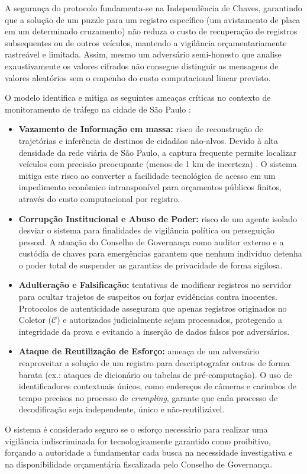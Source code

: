 A segurança do protocolo fundamenta-se na Independência de Chaves, garantindo que a solução de um puzzle para um registro específico (um avistamento de placa em um determinado cruzamento) não reduza o custo de recuperação de registros subsequentes ou de outros veículos, mantendo a vigilância orçamentariamente rastreável e limitada. Assim, mesmo um adversário semi-honesto que analise exaustivamente os valores cifrados não consegue distinguir as mensagens de valores aleatórios sem o empenho do custo computacional linear previsto.

O modelo identifica e mitiga as seguintes ameaças críticas no contexto de monitoramento de tráfego na cidade de São Paulo \cite{Link4}:
\begin{itemize}
    \item \textbf{Vazamento de Informação em massa:} risco de reconstrução de trajetórias e inferência de destinos de cidadãos não-alvos. Devido à alta densidade da rede viária de São Paulo, a captura frequente permite localizar veículos com precisão preocupante (menos de 1 km de incerteza) \cite{Link5}. O sistema mitiga este risco ao converter a facilidade tecnológica de acesso em um impedimento econômico intransponível para orçamentos públicos finitos, através do custo computacional por registro.

    \item \textbf{Corrupção Institucional e Abuso de Poder:} risco de um agente isolado desviar o sistema para finalidades de vigilância política ou perseguição pessoal. A atuação do Conselho de Governança como auditor externo e a custódia de chaves para emergências garantem que nenhum indivíduo detenha o poder total de suspender as garantias de privacidade de forma sigilosa.

    \item \textbf{Adulteração e Falsificação:} tentativas de modificar registros no servidor para ocultar trajetos de suspeitos ou forjar evidências contra inocentes. Protocolos de autenticidade asseguram que apenas registros originados no Coletor ($\mathcal{C}$) e autorizados judicialmente sejam processados, protegendo a integridade da prova e evitando a inserção de dados falsos por adversários.

    \item \textbf{Ataque de Reutilização de Esforço:} ameaça de um adversário reaproveitar a solução de um registro para descriptografar outros de forma barata (ex.: ataques de dicionário ou tabelas de pré-computação). O uso de identificadores contextuais únicos, como endereços de câmeras e carimbos de tempo precisos no processo de \textit{crumpling}, garante que cada processo de decodificação seja independente, único e não-reutilizável.
\end{itemize}

O sistema é considerado seguro se o esforço necessário para realizar uma vigilância indiscriminada for tecnologicamente garantido como proibitivo, forçando a autoridade a fundamentar cada busca na necessidade investigativa e na disponibilidade orçamentária fiscalizada pelo Conselho de Governança.